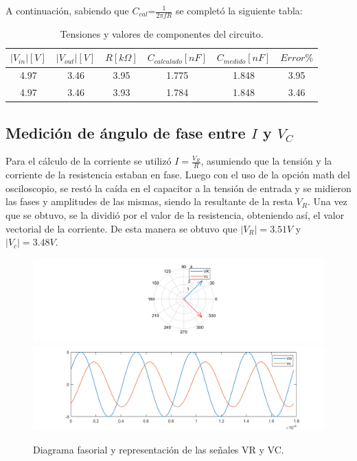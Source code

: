 A continuación, sabiendo que $C_{cal}\text{=}\frac{1}{2\pi fR}$ se completó la siguiente tabla:

\begin{table}[!htb]
\centering
\begin{tabular}{|c|c|c|c|c|c|}
\hline 
$|V_{in}|[V]$ & $|V_{out}|[V]$ & $R[k\Omega]$ & $C_{calculado}[nF]$ & $C_{medido}[nF]$ & $Error\%$\\
\hline 
\hline 
4.97 & 3.46 & 3.95 & 1.775 & 1.848 & 3.95\\
\hline 
4.97 & 3.46 & 3.93 & 1.784 & 1.848 & 3.46\\
\hline 
\end{tabular}
\caption{Tensiones y valores de componentes del circuito.}
\end{table}

\subsection{Medición de ángulo de fase entre $I$ y $V_C$}

Para el cálculo de la corriente se utilizó $I=\frac{V_{R}}{R}$, asumiendo que la tensión y la corriente de la resistencia estaban en fase. 
Luego con el uso de la opción math del osciloscopio, se restó la caída en el capacitor a la tensión de entrada y se midieron las fases y amplitudes de las mismas, siendo la resultante de la resta $V_R$. Una vez que se obtuvo, se la dividió por el valor de la resistencia, obteniendo así, el valor vectorial de la corriente.
De esta manera se obtuvo que $|V_{R}|=3.51V$ y $|V_{c}|=3.48V$.

\begin{figure}[H]
\centering
\includegraphics[scale=0.5]{1-2.png}
\includegraphics[scale=0.5]{1-2b.png}
\caption{Diagrama fasorial y representación de las señales VR y VC.}
\label{fig:diagfasorial}
\end{figure}


